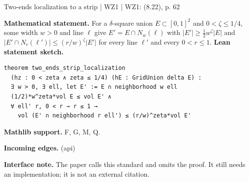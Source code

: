 \documentclass[10pt,a4paper]{article}
\newcommand{\nodecard}[1]{\hyperlink{node-#1}{\texttt{\detokenize{#1}}}}
\begin{document}
\begin{minipage}{\linewidth}
\hypertarget{node-L8_10}{}
\begin{tcolorbox}[colback=white,colframe=radialfg,colbacktitle=radialbg,coltitle=ink,boxrule=0.45pt,arc=1.6mm,left=3mm,right=3mm,top=2mm,bottom=2mm,title={\sffamily\bfseries WZ1 Lemma 8.10 \hfill \texttt{L8\_10}}]
{\sffamily\small\color{muted}Two-ends localization to a strip | WZ1 | WZ1: (8.22), p. 62}\par
\textbf{Mathematical statement.} For a $\delta$-square union $E\subset[0,1]^2$ and $0<\zeta\le1/4$, some width $w>0$ and line $\ell$ give $E'=E\cap N_w(\ell)$ with
$|E'|\ge\tfrac12w^\zeta |E|$ and
$|E'\cap N_r(\ell')|\le(r/w)^\zeta|E'|$
for every line $\ell'$ and every $0<r\le1$.
\smallskip\textbf{Lean statement sketch.}
\begin{Verbatim}[fontsize=\small,breaklines=true,breakanywhere=true,tabsize=2]
theorem two_ends_strip_localization
  (hz : 0 < zeta ∧ zeta ≤ 1/4) (hE : GridUnion delta E) :
  ∃ w > 0, ∃ ell, let E' := E ∩ neighborhood w ell
  (1/2)*w^zeta*vol E ≤ vol E' ∧
  ∀ ell' r, 0 < r → r ≤ 1 →
    vol (E' ∩ neighborhood r ell') ≤ (r/w)^zeta*vol E'
\end{Verbatim}
{\footnotesize\textbf{Mathlib support.} F, G, M, Q.\par
\textbf{Incoming edges.} \nodecard{Ientropy} (api)\par}
{\footnotesize\textbf{Interface note.} The paper calls this standard and omits the proof. It still needs an implementation; it is not an external citation.}
\end{tcolorbox}\end{minipage}\par\medskip
\end{document}
